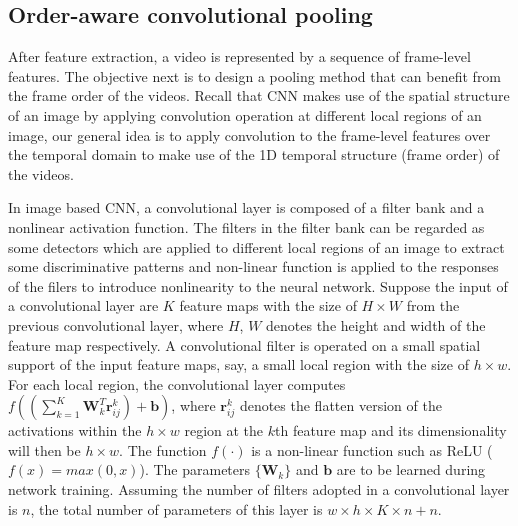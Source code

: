 \documentclass[journal]{IEEEtran}
\begin{document}
\subsection{Order-aware convolutional pooling}

After feature extraction, a video is represented by a sequence of frame-level features. The objective next is to design a pooling method that can benefit from the frame order of the videos.
Recall that CNN makes use of the spatial structure of an image by applying convolution operation at different local regions of an image, our general idea is to apply convolution to the frame-level features over the temporal domain to make use of the 1D temporal structure (frame order) of the videos.

In image based CNN, a convolutional layer is composed of a filter bank and a nonlinear activation function. The filters in the filter bank can be regarded as some detectors which are applied to different local regions of an image to extract some discriminative patterns and non-linear function is applied to the responses of the filers to introduce nonlinearity to the neural network. Suppose the input of a convolutional layer are $K$ feature maps with the size of $H\times W$ from the previous convolutional layer, where $H$, $W$ denotes the height and width of the feature map respectively. A convolutional filter is operated on a small spatial support of the input feature maps, say, a small local region with the size of $h\times w$. For each local region, the convolutional layer computes $f(\left(\sum_{k=1}^K  \mathbf{W}_{k}^T \mathbf{r}^{k}_{ij}\right)+\mathbf{b})$, where $\mathbf{r}^k_{ij}$ denotes the flatten version of the activations within the $h\times w$ region at the $k$th feature map and its dimensionality will then be $h \times w$. The function $f(\cdot)$ is a non-linear function such as ReLU ($f(x)=max(0,x)$). The parameters $\{ \mathbf{W}_k \}$ and $ \mathbf{b}$ are to be learned during network training. Assuming the number of filters adopted in a convolutional layer is $n$, the total number of parameters of this layer is $w\times{h}\times{K}\times{n}+n$.
\end{document}
